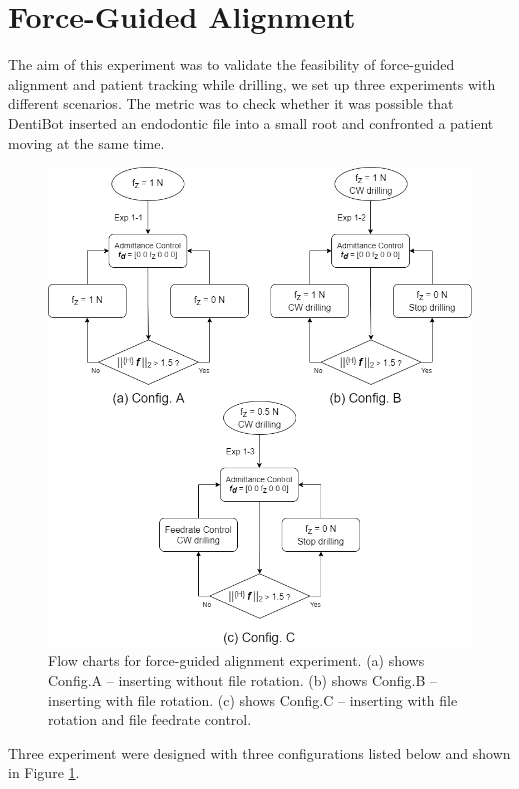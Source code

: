 \section{Force-Guided Alignment}
\hspace*{6mm}The aim of this experiment was to validate the feasibility of force-guided alignment and patient tracking while drilling, we set up three experiments with different scenarios. The metric was to check whether it was possible that DentiBot inserted an endodontic file into a small root and confronted a patient moving at the same time.
\begin{figure}[htbp]
\begin{center}
\includegraphics[width=1\linewidth]{Images/Exp1_motion planning.png}
\caption{Flow charts for force-guided alignment experiment. (a) shows Config.A -- inserting without file rotation. (b) shows Config.B --  inserting with file rotation. (c) shows Config.C --  inserting with file rotation and file feedrate control.}
\label{fig:exp_motion planning}
\end{center}
\end{figure}
\par	
Three experiment were designed with three configurations listed below and shown in Figure \ref{fig:exp_motion planning}.

